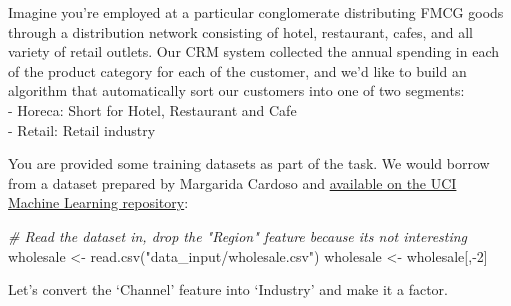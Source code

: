 \documentclass[
]{article}
\newenvironment{Shaded}{\begin{snugshade}}{\end{snugshade}}
\newcommand{\AttributeTok}[1]{\textcolor[rgb]{0.77,0.63,0.00}{#1}}
\newcommand{\CommentTok}[1]{\textcolor[rgb]{0.56,0.35,0.01}{\textit{#1}}}
\newcommand{\DecValTok}[1]{\textcolor[rgb]{0.00,0.00,0.81}{#1}}
\newcommand{\FunctionTok}[1]{\textcolor[rgb]{0.00,0.00,0.00}{#1}}
\newcommand{\NormalTok}[1]{#1}
\newcommand{\OtherTok}[1]{\textcolor[rgb]{0.56,0.35,0.01}{#1}}
\newcommand{\SpecialCharTok}[1]{\textcolor[rgb]{0.00,0.00,0.00}{#1}}
\newcommand{\StringTok}[1]{\textcolor[rgb]{0.31,0.60,0.02}{#1}}
\begin{document}
Imagine you're employed at a particular conglomerate distributing FMCG
goods through a distribution network consisting of hotel, restaurant,
cafes, and all variety of retail outlets. Our CRM system collected the
annual spending in each of the product category for each of the
customer, and we'd like to build an algorithm that automatically sort
our customers into one of two segments:\\
- Horeca: Short for Hotel, Restaurant and Cafe\\
- Retail: Retail industry

You are provided some training datasets as part of the task. We would
borrow from a dataset prepared by Margarida Cardoso and
\href{https://archive.ics.uci.edu/ml/datasets/Wholesale+customers}{available
on the UCI Machine Learning repository}:

\begin{Shaded}
\begin{Highlighting}[]
\CommentTok{\# Read the dataset in, drop the "Region" feature because it\textquotesingle{}s not interesting}
\NormalTok{wholesale }\OtherTok{\textless{}{-}} \FunctionTok{read.csv}\NormalTok{(}\StringTok{"data\_input/wholesale.csv"}\NormalTok{)}
\NormalTok{wholesale }\OtherTok{\textless{}{-}}\NormalTok{ wholesale[,}\SpecialCharTok{{-}}\DecValTok{2}\NormalTok{]}
\end{Highlighting}
\end{Shaded}

Let's convert the `Channel' feature into `Industry' and make it a
factor.

\begin{Shaded}
\end{Shaded}
\end{document}
